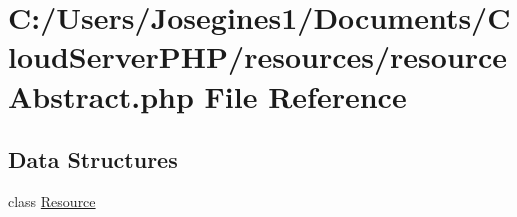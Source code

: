 \hypertarget{resource_abstract_8php}{}\section{C\+:/\+Users/\+Josegines1/\+Documents/\+Cloud\+Server\+P\+H\+P/resources/resource\+Abstract.php File Reference}
\label{resource_abstract_8php}
\subsection*{Data Structures}
\begin{DoxyCompactItemize}
\item 
class \mbox{\hyperlink{class_resource}{Resource}}
\end{DoxyCompactItemize}
